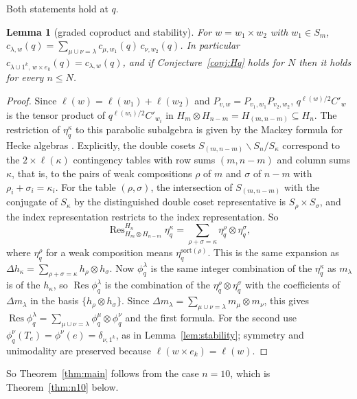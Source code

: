 \documentclass[11pt]{amsart}
\newtheorem{lemma}[theorem]{Lemma}
\theoremstyle{definition}
\theoremstyle{remark}
\begin{document}
Both statements hold at $q$.

\begin{lemma}[graded coproduct and stability]\label{lem:qstability}
For $w=w_1\times w_2$ with $w_1\in S_m$, $c_{\lambda,w}(q)=\sum_{\mu\cup\nu=\lambda}c_{\mu,w_1}(q)\,c_{\nu,w_2}(q)$. In particular $c_{\lambda\cup1^k,\,w\times e_k}(q)=c_{\lambda,w}(q)$, and if Conjecture~\ref{conj:Hq} holds for $N$ then it holds for every $n\le N$.
\end{lemma}

\begin{proof}
Since $\ell(w)=\ell(w_1)+\ell(w_2)$ and $P_{v,w}=P_{v_1,w_1}P_{v_2,w_2}$, $q^{\ell(w)/2}C'_w$ is the tensor product of $q^{\ell(w_i)/2}C'_{w_i}$ in $H_m\otimes H_{n-m}=H_{(m,n-m)}\subseteq H_n$. The restriction of $\eta^\kappa_q$ to this parabolic subalgebra is given by the Mackey formula for Hecke algebras \cite[\S9.1]{GP}. Explicitly, the double cosets $S_{(m,n-m)}\backslash S_n/S_\kappa$ correspond to the $2\times\ell(\kappa)$ contingency tables with row sums $(m,n-m)$ and column sums $\kappa$, that is, to the pairs of weak compositions $\rho$ of $m$ and $\sigma$ of $n-m$ with $\rho_i+\sigma_i=\kappa_i$. For the table $(\rho,\sigma)$, the intersection of $S_{(m,n-m)}$ with the conjugate of $S_\kappa$ by the distinguished double coset representative is $S_\rho\times S_\sigma$, and the index representation restricts to the index representation. So
\[
\operatorname{Res}^{H_n}_{H_m\otimes H_{n-m}}\eta^\kappa_q=\sum_{\rho+\sigma=\kappa}\eta^\rho_q\otimes\eta^\sigma_q ,
\]
where $\eta^\rho_q$ for a weak composition means $\eta^{\mathrm{sort}(\rho)}_q$. This is the same expansion as $\Delta h_\kappa=\sum_{\rho+\sigma=\kappa}h_\rho\otimes h_\sigma$. Now $\phi^\lambda_q$ is the same integer combination of the $\eta^\kappa_q$ as $m_\lambda$ is of the $h_\kappa$, so $\operatorname{Res}\phi^\lambda_q$ is the combination of the $\eta^\rho_q\otimes\eta^\sigma_q$ with the coefficients of $\Delta m_\lambda$ in the basis $\{h_\rho\otimes h_\sigma\}$. Since $\Delta m_\lambda=\sum_{\mu\cup\nu=\lambda}m_\mu\otimes m_\nu$, this gives $\operatorname{Res}\phi^\lambda_q=\sum_{\mu\cup\nu=\lambda}\phi^\mu_q\otimes\phi^\nu_q$ and the first formula. For the second use $\phi^\nu_q(T_e)=\phi^\nu(e)=\delta_{\nu,1^k}$, as in Lemma~\ref{lem:stability}; symmetry and unimodality are preserved because $\ell(w\times e_k)=\ell(w)$.
\end{proof}

So Theorem~\ref{thm:main} follows from the case $n=10$, which is Theorem~\ref{thm:n10} below.
\end{document}
